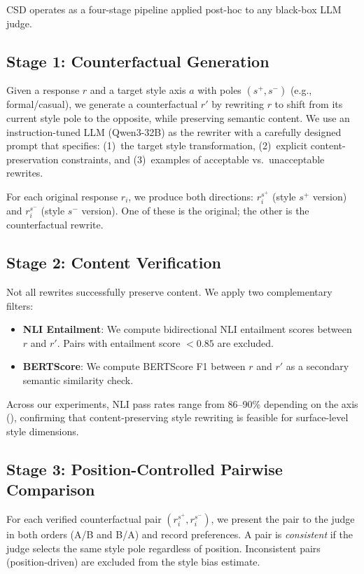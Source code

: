 \documentclass[11pt,a4paper]{article}
\begin{document}
CSD operates as a four-stage pipeline applied post-hoc to any black-box LLM judge.

\subsection{Stage 1: Counterfactual Generation}

Given a response $r$ and a target style axis $a$ with poles $(s^+, s^-)$ (e.g., formal/casual), we generate a counterfactual $r'$ by rewriting $r$ to shift from its current style pole to the opposite, while preserving semantic content.
We use an instruction-tuned LLM (Qwen3-32B) as the rewriter with a carefully designed prompt that specifies: (1)~the target style transformation, (2)~explicit content-preservation constraints, and (3)~examples of acceptable vs.\ unacceptable rewrites.

For each original response $r_i$, we produce both directions: $r_i^{s^+}$ (style $s^+$ version) and $r_i^{s^-}$ (style $s^-$ version).
One of these is the original; the other is the counterfactual rewrite.

\subsection{Stage 2: Content Verification}

Not all rewrites successfully preserve content.
We apply two complementary filters:
\begin{itemize}
    \item \textbf{NLI Entailment}: We compute bidirectional NLI entailment scores between $r$ and $r'$. Pairs with entailment score $< 0.85$ are excluded.
    \item \textbf{BERTScore}: We compute BERTScore F1 between $r$ and $r'$ as a secondary semantic similarity check.
\end{itemize}

Across our experiments, NLI pass rates range from 86--90\% depending on the axis (), confirming that content-preserving style rewriting is feasible for surface-level style dimensions.

\subsection{Stage 3: Position-Controlled Pairwise Comparison}

For each verified counterfactual pair $(r_i^{s^+}, r_i^{s^-})$, we present the pair to the judge in both orders (A/B and B/A) and record preferences.
A pair is \emph{consistent} if the judge selects the same style pole regardless of position.
Inconsistent pairs (position-driven) are excluded from the style bias estimate.
\end{document}
